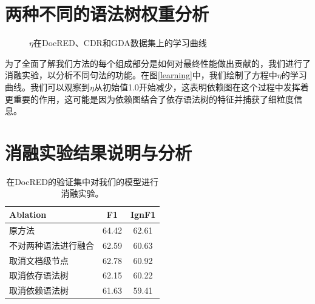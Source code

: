 \documentclass[bachelor]{thesis-uestc}
\begin{document}
\section{两种不同的语法树权重分析}\label{sec:weight}
\begin{figure}[!t]
    \caption{$\eta$在DocRED、CDR和GDA数据集上的学习曲线}
\end{figure}\label{learning}
为了全面了解我们方法的每个组成部分是如何对最终性能做出贡献的，我们进行了消融实验，以分析不同句法的功能。在图\ref{learning}中，我们绘制了方程中$\eta$的学习曲线。我们可以观察到$\eta$从初始值1.0开始减少，这表明依赖图在这个过程中发挥着更重要的作用，这可能是因为依赖图结合了依存语法树的特征并捕获了细粒度信息。 \par

\section{消融实验结果说明与分析}\label{sec:inter}

\begin{table}[]
    \begin{tabular}{llc}
    \hline
    Ablation              & \multicolumn{1}{c}{F1} & \multicolumn{1}{l}{IgnF1} \\ \hline
    原方法             & 64.42                  & 62.61                     \\ 
    不对两种语法进行融合   & 62.59                  & 60.63                     \\
    取消文档级节点 & 62.78                   & 60.92                     \\
    取消依存语法树 & 62.15                  & 60.22                     \\ 
    取消依赖语法树   & 61.63                  & 59.41                     \\
    \hline
    \end{tabular}
    \caption{在DocRED的验证集中对我们的模型进行消融实验。}
\end{table}\label{ablation}
\end{document}
